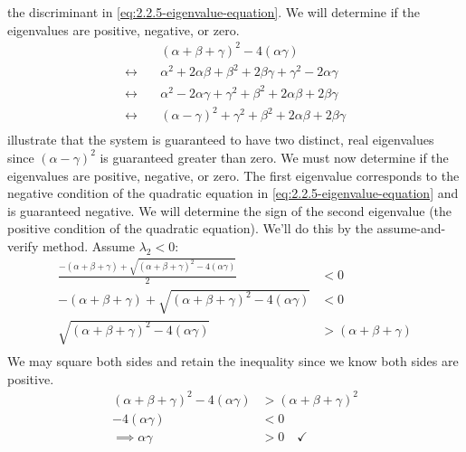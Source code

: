 \documentclass[12pt]{article}
\begin{document}
the discriminant in \cref{eq:2.2.5-eigenvalue-equation}. We will determine if
the eigenvalues are positive, negative, or zero.
\begin{equation}
  \label{eq:2.2.5-positive-illustration}
  \begin{aligned}
    & {(\alpha+\beta+\gamma)}^2-4(\alpha\gamma) \\
    \longleftrightarrow\quad& \alpha^2 + 2\alpha\beta + \beta^2 + 2\beta\gamma +
    \gamma^2 - 2\alpha\gamma \\
    \longleftrightarrow\quad& \alpha^2 - 2\alpha\gamma + \gamma^2 + \beta^2 +
    2\alpha\beta + 2\beta\gamma \\
    \longleftrightarrow\quad& {(\alpha-\gamma)}^2 + \gamma^2 + \beta^2 + 2\alpha\beta +
    2\beta\gamma \\
  \end{aligned}
\end{equation}
 illustrate
that the system is guaranteed to have two distinct, real eigenvalues since
${(\alpha-\gamma)}^2$ is guaranteed greater than zero. We must now determine if
the eigenvalues are positive, negative, or zero. The first eigenvalue
corresponds to the negative condition of the quadratic equation in
\cref{eq:2.2.5-eigenvalue-equation} and is guaranteed negative. We will
determine the sign of the second eigenvalue (the positive condition of the
quadratic equation). We'll do this by the assume-and-verify method. Assume
$\lambda_2<0$:
\begin{equation*}
  \begin{aligned}
    \frac{-(\alpha+\beta+\gamma)+\sqrt{{(\alpha+\beta+\gamma)}^2-4(\alpha\gamma)}}{2} &<0 \\
    -(\alpha+\beta+\gamma)+\sqrt{{(\alpha+\beta+\gamma)}^2-4(\alpha\gamma)} &<0 \\
     \sqrt{{(\alpha+\beta+\gamma)}^2-4(\alpha\gamma)} &> (\alpha+\beta+\gamma) \\
  \end{aligned}
\end{equation*}
We may square both sides and retain the inequality since we know both sides are
positive.
\begin{equation}
  \begin{aligned}
    {(\alpha+\beta+\gamma)}^2-4(\alpha\gamma) &> {(\alpha+\beta+\gamma)}^2 \\
    -4(\alpha\gamma) &< 0 \\
    \implies \alpha\gamma &> 0 \quad\checkmark
  \end{aligned}
\end{equation}
\end{document}
